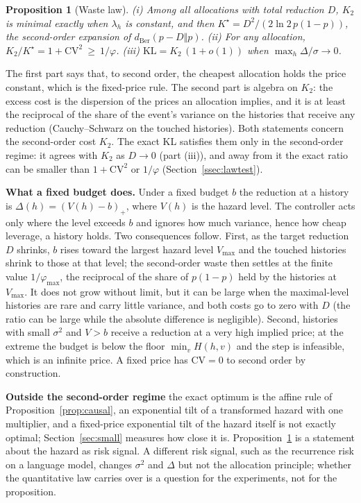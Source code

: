 \documentclass[make,article,submit,pdftex]{Definitions/mdpi}
\providecommand{\KL}{}\renewcommand{\KL}{\mathrm{KL}}
\newtheorem{prop}{Proposition}
\begin{document}
\begin{prop}[Waste law]\label{prop:waste}
(i) Among all allocations with total reduction $D$, $K_2$ is minimal exactly when $\lambda_h$ is constant, and then $K^\star=D^2/(2\ln 2\,p(1-p))$, the second-order expansion of $d_{\mathrm{Ber}}(p-D\Vert p)$.
(ii) For any allocation, $K_2/K^\star=1+\mathrm{CV}^2\ \ge\ 1/\varphi$.
(iii) $\KL=K_2\,(1+o(1))$ when $\max_h\Delta/\sigma\to0$.
\end{prop}
The first part says that, to second order, the cheapest allocation holds the price constant, which is the fixed-price rule. The second part is algebra on $K_2$: the excess cost is the dispersion of the prices an allocation implies, and it is at least the reciprocal of the share of the event's variance on the histories that receive any reduction (Cauchy--Schwarz on the touched histories). Both statements concern the second-order cost $K_2$. The exact KL satisfies them only in the second-order regime: it agrees with $K_2$ as $D\to0$ (part (iii)), and away from it the exact ratio can be smaller than $1+\mathrm{CV}^2$ or $1/\varphi$ (Section~\ref{ssec:lawtest}).

\textbf{What a fixed budget does.} Under a fixed budget $b$ the reduction at a history is $\Delta(h)=(V(h)-b)_+$, where $V(h)$ is the hazard level. The controller acts only where the level exceeds $b$ and ignores how much variance, hence how cheap leverage, a history holds. Two consequences follow. First, as the target reduction $D$ shrinks, $b$ rises toward the largest hazard level $V_{\max}$ and the touched histories shrink to those at that level; the second-order waste then settles at the finite value $1/\varphi_{\max}$, the reciprocal of the share of $p(1-p)$ held by the histories at $V_{\max}$. It does not grow without limit, but it can be large when the maximal-level histories are rare and carry little variance, and both costs go to zero with $D$ (the ratio can be large while the absolute difference is negligible). Second, histories with small $\sigma^2$ and $V>b$ receive a reduction at a very high implied price; at the extreme the budget is below the floor $\min_vH(h,v)$ and the step is infeasible, which is an infinite price. A fixed price has $\mathrm{CV}=0$ to second order by construction.

\textbf{Outside the second-order regime} the exact optimum is the affine rule of Proposition~\ref{prop:causal}, an exponential tilt of a transformed hazard with one multiplier, and a fixed-price exponential tilt of the hazard itself is not exactly optimal; Section~\ref{sec:small} measures how close it is. Proposition~\ref{prop:waste} is a statement about the hazard as risk signal. A different risk signal, such as the recurrence risk on a language model, changes $\sigma^2$ and $\Delta$ but not the allocation principle; whether the quantitative law carries over is a question for the experiments, not for the proposition.
\end{document}
